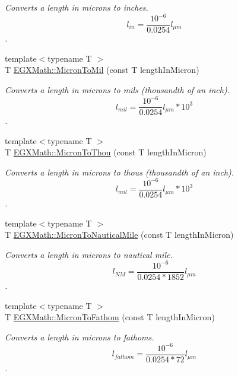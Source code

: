 \begin{DoxyCompactItemize}
\begin{DoxyCompactList}\small\item\em Converts a length in microns to inches. \[ l_{in}= \frac{10^{-6}}{0.0254} l_{\mu m} \]. \end{DoxyCompactList}\item 
{\footnotesize template$<$typename T $>$ }\\T \mbox{\hyperlink{group___e_g_x_math-_conversions-_length_conversions-_non-_s_i-_micron-_imperial_ga691931fc46e3fd33d4e2d83e09fa3db4}{E\+G\+X\+Math\+::\+Micron\+To\+Mil}} (const T length\+In\+Micron)
\begin{DoxyCompactList}\small\item\em Converts a length in microns to mils (thousandth of an inch). \[ l_{mil}= \frac{10^{-6}}{0.0254} l_{\mu m} * 10^{3} \]. \end{DoxyCompactList}\item 
{\footnotesize template$<$typename T $>$ }\\T \mbox{\hyperlink{group___e_g_x_math-_conversions-_length_conversions-_non-_s_i-_micron-_imperial_gaf75a5aad3349d690e8b1bea619fc8706}{E\+G\+X\+Math\+::\+Micron\+To\+Thou}} (const T length\+In\+Micron)
\begin{DoxyCompactList}\small\item\em Converts a length in microns to thous (thousandth of an inch). \[ l_{mil}= \frac{10^{-6}}{0.0254} l_{\mu m} * 10^{3} \]. \end{DoxyCompactList}\item 
{\footnotesize template$<$typename T $>$ }\\T \mbox{\hyperlink{group___e_g_x_math-_conversions-_length_conversions-_non-_s_i-_micron-_nautical_gaa3944ed4bca9dcd37c3043d44cc36bf1}{E\+G\+X\+Math\+::\+Micron\+To\+Nautical\+Mile}} (const T length\+In\+Micron)
\begin{DoxyCompactList}\small\item\em Converts a length in microns to nautical mile. \[ l_{NM}= \frac{10^{-6}}{0.0254 * 1852} l_{\mu m} \]. \end{DoxyCompactList}\item 
{\footnotesize template$<$typename T $>$ }\\T \mbox{\hyperlink{group___e_g_x_math-_conversions-_length_conversions-_non-_s_i-_micron-_nautical_ga5cb74ac25926c826943b859a582a5e6a}{E\+G\+X\+Math\+::\+Micron\+To\+Fathom}} (const T length\+In\+Micron)
\begin{DoxyCompactList}\small\item\em Converts a length in microns to fathoms. \[ l_{fathom}= \frac{10^{-6}}{0.0254 * 72} l_{\mu m} \]. \end{DoxyCompactList}\item 

\end{DoxyCompactItemize}
